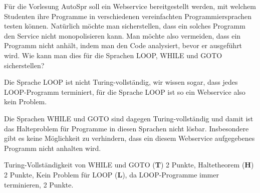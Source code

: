Für die Vorlesung AutoSpr soll ein Webservice bereitgestellt werden, mit
welchem Studenten ihre Programme in verschiedenen vereinfachten
Programmiersprachen testen können.
Natürlich möchte man sicherstellen, dass ein solches Programm den 
Service nicht monopolisieren kann.
Man möchte also vermeiden, dass ein Programm nicht anhält,
indem man den Code analysiert, bevor er ausgeführt wird.
Wie kann man dies für die Sprachen LOOP, WHILE und GOTO sicherstellen?


\begin{loesung}
Die Sprache LOOP ist nicht Turing-vollständig, wir wissen sogar,
dass jedes LOOP-Pro\-gramm terminiert, für die Sprache LOOP ist so ein
Webservice also kein Problem.

Die Sprachen WHILE und GOTO sind dagegen Turing-vollständig und damit
ist das Halteproblem für Programme in diesen Sprachen nicht lösbar.
Insbesondere gibt es keine Möglichkeit zu verhindern, dass ein diesem
Webservice aufgegebenes Programm nicht anhalten wird.
\end{loesung}

\begin{bewertung}
Turing-Vollständigkeit von WHILE und GOTO ({\bf T}) 2 Punkte,
Haltetheorem ({\bf H}) 2 Punkte,
Kein Problem für LOOP ({\bf L}), da LOOP-Programme immer terminieren, 2 Punkte.
\end{bewertung}


